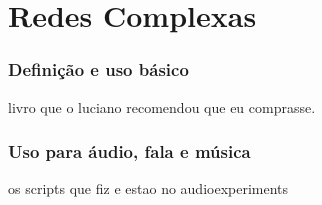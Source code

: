 \chapter{Redes Complexas}
\label{cap:redescomplexas}

\subsection{Definição e uso básico}
livro que o luciano recomendou que eu comprasse.

\subsection{Uso para áudio, fala e música}
os scripts que fiz e estao no audioexperiments


